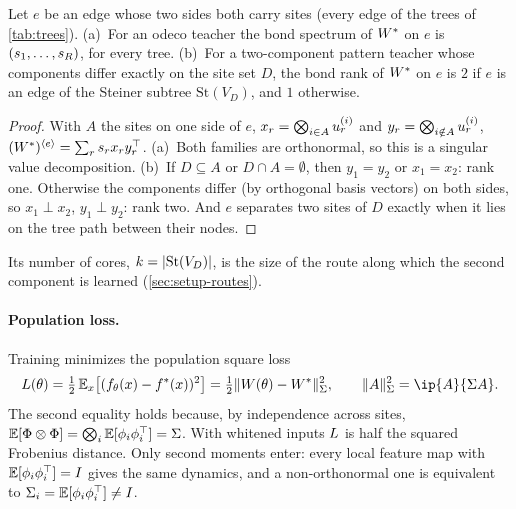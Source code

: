\begin{proposition}\label{prop:teacher-spectra}
  \proven{} Let $e$ be an edge whose two sides both carry sites (every edge of the trees of
  \cref{tab:trees}). (a)~For an odeco teacher the bond spectrum of $W^{*}$ on $e$ is
  $(s_{1},\dots,s_{R})$, for every tree. (b)~For a two-component pattern teacher whose
  components differ exactly on the site set $D$, the bond rank of $W^{*}$ on $e$ is $2$ if $e$ is an
  edge of the Steiner subtree $\mathrm{St}(V_D)$, and $1$ otherwise.
\end{proposition}
\begin{proof}
  With $A$ the sites on one side of $e$, $x_r=\bigotimes_{i\in A}u_{r}^{(i)}$ and
  $y_r=\bigotimes_{i\notin A}u_{r}^{(i)}$, $(W^{*})^{\langle e\rangle}=\sum_rs_{r}x_ry_r^{\top}$. (a)~Both families are
  orthonormal, so this is a singular value decomposition. (b)~If $D\subseteq A$ or $D\cap A=\emptyset$,
  then $y_1=y_2$ or $x_1=x_2$: rank one. Otherwise the components differ (by orthogonal basis vectors)
  on both sides, so $x_1\perp x_2$, $y_1\perp y_2$: rank two. And $e$ separates two sites of $D$
  exactly when it lies on the tree path between their nodes.
\end{proof}
Its number of cores, $k=\lvert\mathrm{St}(V_D)\rvert$, is the size of the route along which the second
component is learned (\cref{sec:setup-routes}).

\paragraph{Population loss.}
Training minimizes the population square loss
\begin{equation}\label{eq:loss}
  \Loss(\params)=\tfrac12\,\E_x\big[(f_\params(x)-f^*(x))^2\big]
  =\tfrac12\normS{\W(\params)-\Wt}^2,
  \qquad \normS{A}^2=\ip{A}{\Sig A}.
\end{equation}
The second equality holds because, by independence across sites,
$\mathbb{E}[\Phi\otimes\Phi]=\bigotimes_i\mathbb{E}[\phi_{i}\phi_{i}^{\top}]=\Sigma$. With whitened inputs $L$ is half
the squared Frobenius distance. Only second moments enter: every local feature map with
$\mathbb{E}[\phi_{i}\phi_{i}^{\top}]=I$ gives the same dynamics, and a non-orthonormal one is equivalent to
$\Sigma_{i}=\mathbb{E}[\phi_{i}\phi_{i}^{\top}]\ne I$.


